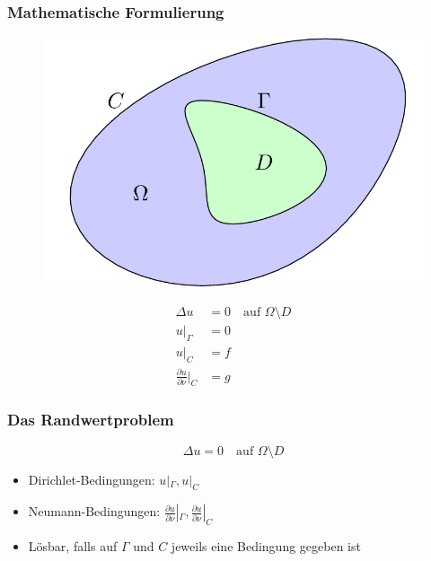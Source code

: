 \documentclass{beamer}
\begin{document}
\begin{frame}
	\frametitle{Mathematische Formulierung}
	\begin{minipage}{0.50\textwidth}
		\begin{figure}
			\centering
			\includegraphics[width=\textwidth]{tikz/basic.png}
		\end{figure}
	\end{minipage}
	\hfill
	\begin{minipage}{0.48\textwidth}
		\pause
		\begin{align*}
			\Delta u &= 0 \quad \text{auf $\Omega \setminus D$} \\
			u|_\Gamma &= 0 \\
			u|_C &= f \\
			\tfrac{\partial u}{\partial \nu}|_C &= g
		\end{align*}
	\end{minipage}
\end{frame}

\begin{frame}
	\frametitle{Das Randwertproblem}
	\[
		\Delta u = 0 \quad \text{auf $\Omega \setminus D$}
	\]
	\begin{itemize}
		\item
			Dirichlet-Bedingungen: $u|_\Gamma, u|_C$
		\item
			Neumann-Bedingungen: $\frac{\partial u}{\partial \nu}|_\Gamma, \frac{\partial u}{\partial \nu}|_C$
		\item
			Lösbar, falls auf $\Gamma$ und $C$ jeweils eine Bedingung gegeben ist
	\end{itemize}
\end{frame}
\end{document}
